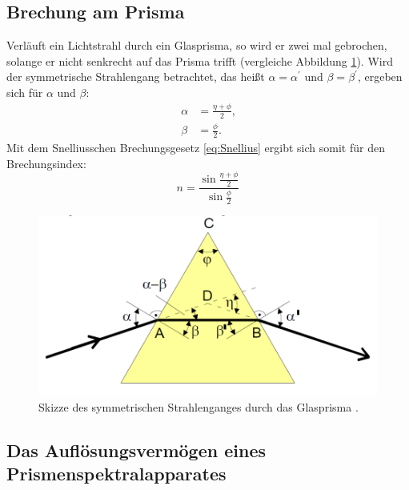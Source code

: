 \subsection{Brechung am Prisma}

Verläuft ein Lichtstrahl durch ein Glasprisma, so wird er zwei mal gebrochen, solange er nicht senkrecht auf das Prisma trifft (vergleiche Abbildung \ref{fig:Prisma}). Wird der symmetrische Strahlengang betrachtet, das heißt $\alpha =\alpha^\prime$ und $\beta =\beta^\prime$, ergeben sich für $\alpha$ und $\beta$:
\begin{align*}
\alpha 	&= \frac{\eta+\phi}{2}\text{,}\\
\beta 	&= \frac{\phi}{2}\text{.}
\end{align*}
Mit dem Snelliusschen Brechungsgesetz \eqref{eq:Snellius} ergibt sich somit für den Brechungsindex:
\begin{equation}
n = \frac{\sin\frac{\eta +\phi}{2}}{\sin\frac{\phi}{2}}\label{eq:n}
\end{equation}

\begin{figure}
\centering
\includegraphics[width=\linewidth-70pt,height=\textheight-70pt,keepaspectratio]{content/images/Prisma.png}
\caption{Skizze des symmetrischen Strahlenganges durch das Glasprisma \cite{V402}.}
\label{fig:Prisma}
\end{figure}

\subsection{Das Auflösungsvermögen eines Prismenspektralapparates}


